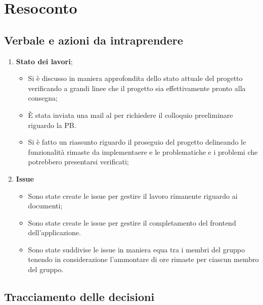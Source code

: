 \section{Resoconto}
\subsection{Verbale e azioni da intraprendere}

\begin{enumerate}
	\item \textbf{Stato dei lavori};
	\begin{itemize}
		\item Si è discusso in maniera approfondita dello stato attuale del progetto verificando a grandi linee che il progetto sia effettivamente pronto alla consegna;
		\item È stata inviata una mail al \commitNameS{} per richiedere il colloquio preeliminare riguardo la PB.
		\item Si è fatto un riassunto riguardo il proseguio del progetto delineando  le funzionalità rimaste da implementaere e le problematiche e i problemi che potrebbero presentarsi verificati;
	\end{itemize}

	\item \textbf{Issue}
	\begin{itemize}
		\item Sono state create le issue  per gestire il lavoro rimanente riguardo ai documenti;
		\item Sono state create le issue per gestire il completamento del frontend dell'applicazione.
		\item Sono state suddivise le issue in maniera equa tra i membri del gruppo tenendo in considerazione l'ammontare di ore rimaste per ciascun membro del gruppo.
	\end{itemize}
\end{enumerate}

\pagebreak

\subsection{Tracciamento delle decisioni}

